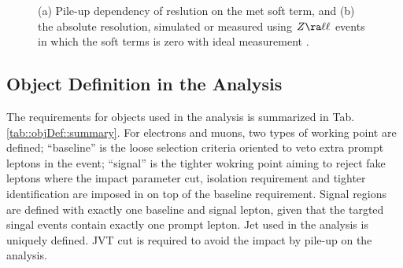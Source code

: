 \begin{figure}[h]
  \centering
    \caption{ (a) Pile-up dependency of reslution on the met soft term, and (b) the absolute resolution,
      simulated or measured using $Z\ra \ell\ell$ events in which the soft terms is zero with ideal measurement \cite{177_MET_data2016}. 
      \label{fig::objDef::metPerformance}
 }
\end{figure}



\subsection{Object Definition in the Analysis} \label{sec::objDef::objDef}
The requirements for objects used in the analysis is summarized in Tab. \ref{tab::objDef::summary}.
For electrons and muons, two types of working point are defined;
``baseline'' is the loose selection criteria oriented to veto extra prompt leptons in the event; 
``signal'' is the tighter wokring point aiming to reject fake leptons where the impact parameter cut, isolation requirement and tighter identification are imposed in on top of the baseline requirement.
Signal regions are defined with exactly one baseline and signal lepton, given that the targted singal events contain exactly one prompt lepton. Jet used in the analysis is uniquely defined. JVT cut is required to avoid the impact by pile-up on the analysis. \\


